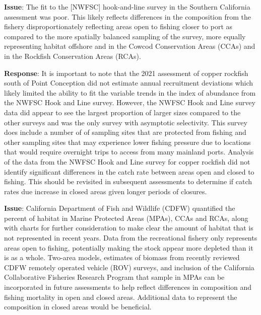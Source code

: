 \documentclass[11pt,
  english,
  letterpaper,
]{article}
\begin{document}
\textbf{Issue}: The fit to the {[}NWFSC{]} hook-and-line survey in the Southern California assessment was poor. This likely reflects differences in the composition from the fishery disproportionately reflecting areas open to fishing closer to port as compared to the more spatially balanced sampling of the survey, more equally representing habitat offshore and in the Cowcod Conservation Areas (CCAs) and in the Rockfish Conservation Areas (RCAs).

\textbf{Response}: It is important to note that the 2021 assessment of copper rockfish south of Point Conception did not estimate annual recruitment deviations which likely limited the ability to fit the variable trends in the index of abundance from the NWFSC Hook and Line survey. However, the NWFSC Hook and Line survey data did appear to see the largest proportion of larger sizes compared to the other surveys and was the only survey with asymptotic selectivity. This survey does include a number of of sampling sites that are protected from fishing and other sampling sites that may experience lower fishing pressure due to locations that would require overnight trips to access from many mainland ports. Analysis of the data from the NWFSC Hook and Line survey for copper rockfish did not identify significant differences in the catch rate between areas open and closed to fishing. This should be revisited in subsequent assessments to determine if catch rates due increase in closed areas given longer periods of closures.

\textbf{Issue}: California Department of Fish and Wildlife (CDFW) quantified the percent of habitat in Marine Protected Areas (MPAs), CCAs and RCAs, along with charts for further consideration to make clear the amount of habitat that is not represented in recent years. Data from the recreational fishery only represents areas open to fishing, potentially making the stock appear more depleted than it is as a whole. Two-area models, estimates of biomass from recently reviewed CDFW remotely operated vehicle (ROV) surveys, and inclusion of the California Collaborative Fisheries Research Program that sample in MPAs can be incorporated in future assessments to help reflect differences in composition and fishing mortality in open and closed areas. Additional data to represent the composition in closed areas would be beneficial.
\end{document}
